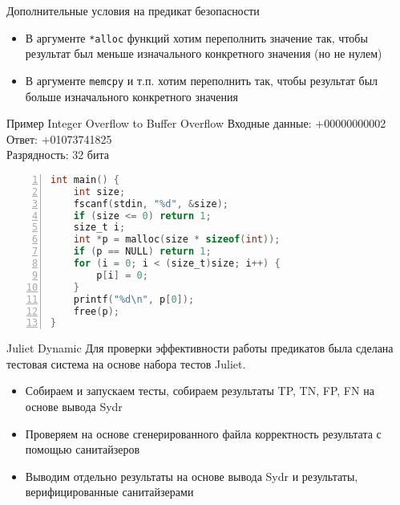 \documentclass[10pt]{beamer}
\begin{document}
\begin{frame}{Дополнительные условия на предикат безопасности}
\begin{itemize}
    \item В аргументе \texttt{*alloc} функций хотим
        переполнить значение так, чтобы результат был меньше изначального конкретного
        значения (но не нулем)
    \item В аргументе \texttt{memcpy} и т.п. хотим
        переполнить так, чтобы результат был больше изначального конкретного
        значения
\end{itemize}
\end{frame}

\begin{frame}[fragile]{Пример Integer Overflow to Buffer Overflow}
    Входные данные: +00000000002\\
    Ответ: +01073741825 \\
    Разрядность: 32 бита
\begin{lstlisting}[language=C, basicstyle=\footnotesize, numbers=left,
                   xleftmargin=2em, numberstyle=\tiny\color{gray}]
int main() {
    int size;
    fscanf(stdin, "%d", &size);
    if (size <= 0) return 1;
    size_t i;
    int *p = malloc(size * sizeof(int));
    if (p == NULL) return 1;
    for (i = 0; i < (size_t)size; i++) {
        p[i] = 0;
    }
    printf("%d\n", p[0]);
    free(p);
}
\end{lstlisting}
\end{frame}

\begin{frame}{Juliet Dynamic}
Для проверки эффективности работы предикатов была сделана тестовая система на
основе набора тестов Juliet.
\begin{itemize}
    \item Собираем и запускаем тесты, собираем результаты TP, TN, FP, FN на
        основе вывода Sydr
    \item Проверяем на основе сгенерированного файла корректность результата с
        помощью санитайзеров
    \item Выводим отдельно результаты на основе вывода Sydr и результаты,
        верифицированные санитайзерами
\end{itemize}
\end{frame}
\end{document}
